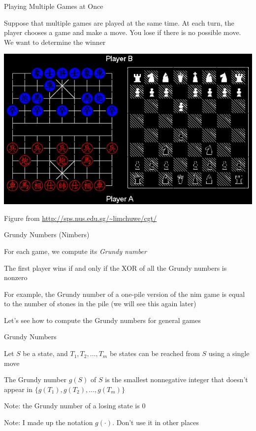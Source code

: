 \documentclass[13pt,onlymath]{beamer}
\begin{document}
\begin{frame}{Playing Multiple Games at Once}
\BIT
\item Suppose that multiple games are played at the same time. At each turn, the player chooses a game and make a move. You lose if there is no possible move. We want to determine the winner
\EIT
\begin{center}
\includegraphics[height=0.5\textheight]{figures/games.jpg}

Figure from \url{http://sps.nus.edu.sg/~limchuwe/cgt/}
\end{center}
\end{frame}

\begin{frame}{Grundy Numbers (Nimbers)}
\BIT
\item For each game, we compute its \emph{Grundy number}
\item The first player wins if and only if the XOR of all the Grundy numbers is nonzero
\BIT
\item For example, the Grundy number of a one-pile version of the nim game is equal to the number of stones in the pile (we will see this again later)
\EIT
\vfill
\item Let's see how to compute the Grundy numbers for general games
\EIT
\end{frame}

\begin{frame}{Grundy Numbers}
\BIT
\item Let $S$ be a state, and $T_1, T_2, \ldots, T_m$ be states can be reached from $S$ using a single move
\vfill
\item The Grundy number $g(S)$ of $S$ is the smallest nonnegative integer that doesn't appear in $\{g(T_1), g(T_2), \ldots, g(T_m)\}$
\BIT
\item Note: the Grundy number of a losing state is 0
\item Note: I made up the notation $g(\cdot)$. Don't use it in other places
\EIT
\EIT
\end{frame}
\end{document}
